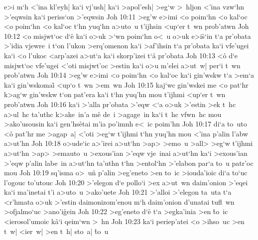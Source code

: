 e>i
m`h
<'ina
kl'eyh|
ka`i
vj'ush|
ka`i
>apol'esh|
>eg`w
>~hljon
<'ina
vzw`hn
>'eqwsin
ka`i
periss`on
>'eqwsin\bibvsend
\vs Joh 10:11
>eg'w
e>imi
<o
poim`hn
<o
kal`oc
<o
poim`hn
<o
kal`oc
t`hn
yuq`hn
a>uto~u
t'ijhsin
<up`er
t~wn
prob'atwn\bibvsend
\vs Joh 10:12
<o
misjwt`oc
d`e\r{}
ka`i
o>uk
>`wn
poim`hn
o<~u
o>uk
e>i\r{s}`in
t`a
pr'obata
>'idia
vjewre~i
t`on
l'ukon
>erq'omenon
ka`i
>af'ihsin
t`a
pr'obata
ka`i
vfe'ugei
ka`i
<o
l'ukoc
<arp'azei
a>ut`a
ka`i
skorp'izei
t`a\r{}
pr'obata\bibvsend
\vs Joh 10:13
<o\r{}
d`e
misjwt`oc
vfe'ugei
<'oti
misjwt'oc
>estin
ka`i
o>u
m'elei
a>ut~w|
per`i
t~wn
prob'atwn\bibvsend
\vs Joh 10:14
>eg'w
e>imi
<o
poim`hn
<o
kal`oc
ka`i
gin'wskw
t`a
>em`a
ka`i
gin'wskomai\r{}
<up`o
t~wn
>em~wn\bibvsend
\vs Joh 10:15
kaj`wc
gin'wskei
me
<o
pat`hr
k>ag`w
gin'wskw
t`on
pat'era
ka`i
t`hn
yuq'hn
mou
t'ijhmi
<up`er
t~wn
prob'atwn\bibvsend
\vs Joh 10:16
ka`i
>'alla
pr'obata
>'eqw
<`a
o>uk
>'estin
>ek
t~hc
a>ul~hc
ta'uthc
k>ake~in'a
me\r{}
de~i
>agage~in
ka`i
t~hc
vfwn~hc
mou
>ako'usousin
ka`i
gen'hs\r{e}tai
m'ia
po'imnh
e<~ic
poim'hn\bibvsend
\vs Joh 10:17
di`a
to~uto
<o\r{}
pat'hr
me
>agap~a|
<'oti
>eg`w
t'ijhmi
t`hn
yuq'hn
mou
<'ina
p'alin
l'abw
a>ut'hn\bibvsend
\vs Joh 10:18
o>ude`ic
a>'irei
a>ut`hn
>ap>
>emo~u
>all>
>eg`w
t'ijhmi
a>ut`hn
>ap>
>emauto~u
>exous'ian
>'eqw
vje~inai
a>ut`hn
ka`i
>exous'ian
>'eqw
p'alin
labe~in
a>ut`hn
ta'uthn
t`hn
>entol`hn
>'elabon
par`a
to~u
patr'oc
mou\bibvsend
\vs Joh 10:19
sq'isma
o>~u\r{n}
p'alin
>eg'eneto
>en
to~ic
>iouda'ioic
di`a
to`uc
l'ogouc
to'utouc\bibvsend
\vs Joh 10:20
>'elegon
d`e
pollo`i
>ex
a>ut~wn
daim'onion
>'eqei
ka`i
ma'inetai
t'i
a>uto~u
>ako'uete\bibvsend
\vs Joh 10:21
>'alloi
>'elegon
ta~uta
t`a
<r'hmata
o>uk
>'estin
daimonizom'enou
m`h
daim'onion
d'unatai
tufl~wn
>ofjalmo`uc
>ano'i\r{g}ein\bibvsend
{}
\vs Joh 10:22
>eg'eneto
d`e\r{}
t`a
>egka'inia
>en
\r{t}o~ic
<ierosol'umoic
k\r{a}`i
qeim`wn
>~hn\bibvsend
\vs Joh 10:23
ka`i
periep'atei
<o
>ihso~uc
>en
t~w|
<ier~w|
>en
t~h|
sto~a|
\r{t}o~u
